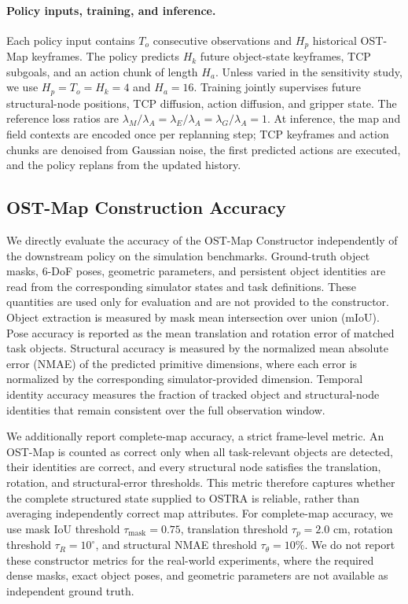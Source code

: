 \paragraph{Policy inputs, training, and inference.}
Each policy input contains $T_o$ consecutive observations and $H_p$ historical
OST-Map keyframes. The policy predicts $H_k$ future object-state keyframes, TCP
subgoals, and an action chunk of length $H_a$. Unless varied in the sensitivity
study, we use $H_p=T_o=H_k=4$ and $H_a=16$. Training jointly supervises future
structural-node positions, TCP diffusion, action diffusion, and gripper state.
The reference loss ratios are
$\lambda_M/\lambda_A=\lambda_E/\lambda_A=\lambda_G/\lambda_A=1$.
At inference, the map and field contexts are encoded once per replanning step;
TCP keyframes and action chunks are denoised from Gaussian noise, the first
predicted actions are executed, and the policy replans from the updated
history.

\subsection{OST-Map Construction Accuracy}
\label{app:ost_map_accuracy}

We directly evaluate the accuracy of the OST-Map Constructor independently of
the downstream policy on the simulation benchmarks. Ground-truth object masks,
6-DoF poses, geometric parameters, and persistent object identities are read
from the corresponding simulator states and task definitions. These quantities
are used only for evaluation and are not provided to the constructor.
Object extraction is measured by mask mean intersection over union (mIoU).
Pose accuracy is reported as the mean translation and rotation error of
matched task objects. Structural accuracy is measured by the normalized mean
absolute error (NMAE) of the predicted primitive dimensions, where each error
is normalized by the corresponding simulator-provided dimension. Temporal
identity accuracy measures the fraction of tracked object and structural-node
identities that remain consistent over the full observation window.

We additionally report complete-map accuracy, a strict frame-level metric. An
OST-Map is counted as correct only when all task-relevant objects are detected,
their identities are correct, and every structural node satisfies the
translation, rotation, and structural-error thresholds. This metric therefore
captures whether the complete structured state supplied to OSTRA is reliable,
rather than averaging independently correct map attributes.
For complete-map accuracy, we use mask IoU threshold
$\tau_{\mathrm{mask}}=0.75$, translation threshold
$\tau_p=2.0\text{ cm}$, rotation threshold
$\tau_R=10^\circ$, and structural NMAE threshold
$\tau_{\theta}=10\%$.
We do not report these constructor metrics for the real-world experiments,
where the required dense masks, exact object poses, and geometric parameters
are not available as independent ground truth.

